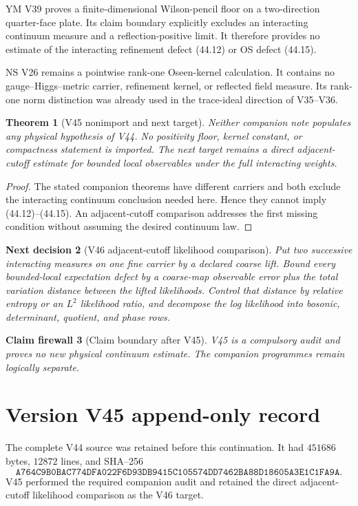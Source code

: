 \documentclass[11pt]{article}
\newtheorem{theorem}{Theorem}[section]
\newtheorem{firewall}[theorem]{Claim firewall}
\newtheorem{decision}[theorem]{Next decision}
\theoremstyle{remark}
\begin{document}
YM V39 proves a finite-dimensional Wilson-pencil floor on a
two-direction quarter-face plate.  Its claim boundary explicitly
excludes an interacting continuum measure and a reflection-positive
limit.  It therefore provides no estimate of the interacting
refinement defect (44.12) or OS defect (44.15).

NS V26 remains a pointwise rank-one Oseen-kernel calculation.  It
contains no gauge--Higgs--metric carrier, refinement kernel, or
reflected field measure.  Its rank-one norm distinction was already
used in the trace-ideal direction of V35--V36.

\begin{theorem}[V45 nonimport and next target]
\label{thm:v15v45-audit}
Neither companion note populates any physical hypothesis of V44.
No positivity floor, kernel constant, or compactness statement is
imported.  The next target remains a direct adjacent-cutoff estimate
for bounded local observables under the full interacting weights.
\end{theorem}

\begin{proof}
The stated companion theorems have different carriers and both
exclude the interacting continuum conclusion needed here.  Hence
they cannot imply (44.12)--(44.15).  An adjacent-cutoff comparison
addresses the first missing condition without assuming the desired
continuum law.
\end{proof}

\begin{decision}[V46 adjacent-cutoff likelihood comparison]
\label{dec:v15v45-next}
Put two successive interacting measures on one fine carrier by a
declared coarse lift.  Bound every bounded-local expectation defect
by a coarse-map observable error plus the total variation distance
between the lifted likelihoods.  Control that distance by relative
entropy or an \(L^2\) likelihood ratio, and decompose the log
likelihood into bosonic, determinant, quotient, and phase rows.
\end{decision}

\begin{firewall}[Claim boundary after V45]
\label{fire:v15v45}
V45 is a compulsory audit and proves no new physical continuum
estimate.  The companion programmes remain logically separate.
\end{firewall}

\section*{Version V45 append-only record}
The complete V44 source was retained before this continuation.  It
had \(451686\) bytes, \(12872\) lines, and SHA--256
\[
 \texttt{A764C9B0BAC774DFA022F6D93DB9415C105574DD7462BA88D18605A3E1C1FA9A}.
\]
V45 performed the required companion audit and retained the direct
adjacent-cutoff likelihood comparison as the V46 target.
\end{document}
